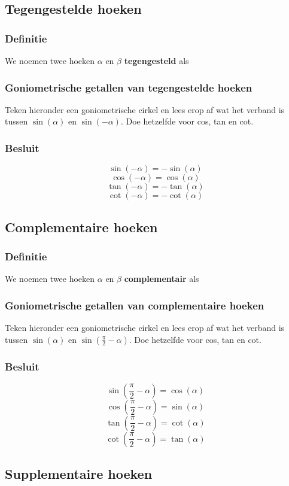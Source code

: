 \documentclass[a4paper,12pt]{article}
\begin{document}
\subsection{Tegengestelde hoeken}
\subsubsection{Definitie}
We noemen twee hoeken $\alpha$ en $\beta$ \textbf{tegengesteld} als \arulefill
\subsubsection{Goniometrische getallen van tegengestelde hoeken}
Teken hieronder een goniometrische cirkel en lees erop af wat het verband is tussen $\sin(\alpha)$ en $\sin(-\alpha)$. Doe hetzelfde voor cos, tan en cot.
\vspace*{3cm}
\subsubsection{Besluit}
\[\sin(-\alpha)=-\sin(\alpha)
\]
\[\cos(-\alpha)=\cos(\alpha)
\]
\[\tan(-\alpha)=-\tan(\alpha)
\]
\[\cot(-\alpha)=-\cot(\alpha)
\]

\subsection{Complementaire hoeken}
\subsubsection{Definitie}
We noemen twee hoeken $\alpha$ en $\beta$ \textbf{complementair} als \arulefill
\subsubsection{Goniometrische getallen van complementaire hoeken}
Teken hieronder een goniometrische cirkel en lees erop af wat het verband is tussen $\sin(\alpha)$ en $\sin(\frac{\pi}{2}-\alpha)$. Doe hetzelfde voor cos, tan en cot.
\vspace*{7cm}
\subsubsection{Besluit}
\[\sin(\frac{\pi}{2}-\alpha)=\cos(\alpha)
\]
\[\cos(\frac{\pi}{2}-\alpha)=\sin(\alpha)
\]
\[\tan(\frac{\pi}{2}-\alpha)=\cot(\alpha)
\]
\[\cot(\frac{\pi}{2}-\alpha)=\tan(\alpha)
\]

\subsection{Supplementaire hoeken}
\end{document}
